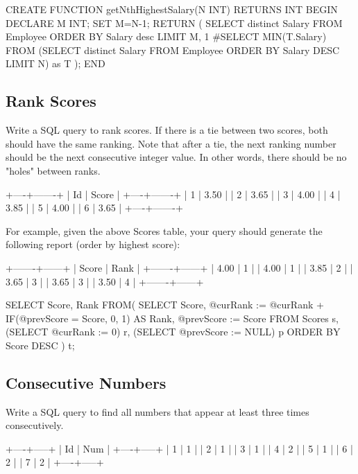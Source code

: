 \begin{Code}
	CREATE FUNCTION getNthHighestSalary(N INT) RETURNS INT
	BEGIN
		DECLARE M INT;
		SET M=N-1;
		RETURN (
			SELECT distinct Salary FROM Employee ORDER BY Salary desc LIMIT M, 1
			#SELECT MIN(T.Salary) FROM (SELECT distinct Salary FROM Employee ORDER BY Salary DESC LIMIT N) as T
		);
	END
\end{Code}

\subsection{Rank Scores}
Write a SQL query to rank scores. If there is a tie between two scores, both should have the same ranking. Note that after a tie, the next ranking number should be the next 
consecutive integer value. In other words, there should be no "holes" between ranks.
\begin{Code}
	+----+-------+
	| Id | Score |
	+----+-------+
	| 1  | 3.50  |
	| 2  | 3.65  |
	| 3  | 4.00  |
	| 4  | 3.85  |
	| 5  | 4.00  |
	| 6  | 3.65  |
	+----+-------+
\end{Code}

For example, given the above Scores table, your query should generate the following report (order by highest score):

\begin{Code}
	+-------+------+
	| Score | Rank |
	+-------+------+
	| 4.00  | 1    |
	| 4.00  | 1    |
	| 3.85  | 2    |
	| 3.65  | 3    |
	| 3.65  | 3    |
	| 3.50  | 4    |
	+-------+------+
\end{Code}

\begin{Code}
	SELECT Score, Rank FROM(
		SELECT    Score,
		@curRank := @curRank + IF(@prevScore = Score, 0, 1) AS Rank,
		@prevScore := Score
	FROM  Scores s, (SELECT @curRank := 0) r, (SELECT @prevScore := NULL) p
	ORDER BY  Score DESC
	) t;
\end{Code}

\subsection{Consecutive Numbers}
Write a SQL query to find all numbers that appear at least three times consecutively.

\begin{Code}
	+----+-----+
	| Id | Num |
	+----+-----+
	| 1  |  1  |
	| 2  |  1  |
	| 3  |  1  |
	| 4  |  2  |
	| 5  |  1  |
	| 6  |  2  |
	| 7  |  2  |
	+----+-----+
\end{Code}

